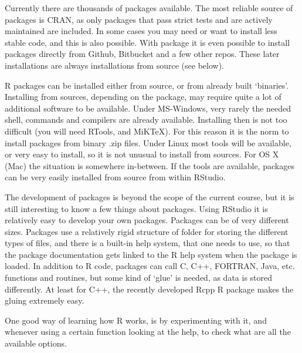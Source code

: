 \documentclass[paper=a4,headsepline,BCOR=12mm,twoside,open=right,%
titlepage,headings=small,fontsize=10pt,index=totoc,bibliography=totoc,%
captions=tableheading,captions=nooneline]{scrbook}\usepackage{knitr}
\begin{document}
\begin{knitrout}\footnotesize
{}\color{fgcolor}\begin{kframe}
\begin{alltt}
\end{alltt}
\end{kframe}
\end{knitrout}

Currently there are thousands of packages available. The most reliable source of packages is CRAN, as only packages that pass strict tests and are actively maintained are included. In some cases you may need or want to install less stable code, and this is also possible. With package  it is even possible to install packages directly from Github, Bitbucket and a few other repos. These later installations are always installations from source (see below).

R packages can be installed either from source, or from already built `binaries'. Installing from sources, depending on the package, may require quite a lot of additional software to be available. Under MS-Windows, very rarely the needed shell, commands and compilers are already available. Installing then is not too difficult (you will need RTools, and MiKTeX). For this reason it is the norm to install packages from binary .zip files. Under Linux most tools will be available, or very easy to install, so it is not unusual to install from sources. For OS X (Mac) the situation is somewhere in-between. If the tools are available, packages can be very easily installed from source from within RStudio.

The development of packages is beyond the scope of the current course, but it is still interesting to know a few things about packages. Using RStudio it is relatively easy to develop your own packages. Packages can be of very different sizes. Packages use a relatively rigid structure of folder for storing the different types of files, and there is a built-in help system, that one needs to use, so that the package documentation gets linked to the R help system when the package is loaded. In addition to R code, packages can call C, C++, FORTRAN, Java, etc. functions and routines, but some kind of `glue' is needed, as data is stored differently. At least for C++, the recently developed Rcpp R package makes the gluing extremely easy.

One good way of learning how R works, is by experimenting with it, and whenever using a certain function looking at the help, to check what are all the available options.
\end{document}
